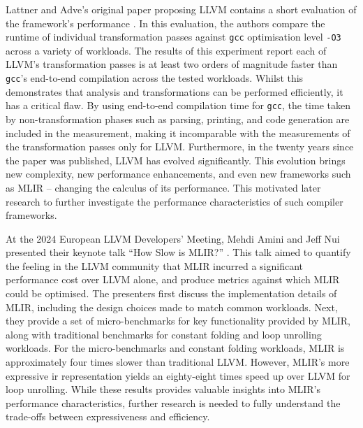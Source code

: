 Lattner and Adve's original paper proposing LLVM contains a short evaluation of the framework's performance \cite[Section 4.1.4]{lattnerLLVMCompilationFramework2004}.
In this evaluation, the authors compare the runtime of individual transformation passes against \texttt{gcc} optimisation level \texttt{-O3} across a variety of workloads.
The results of this experiment \cite[Table 2]{lattnerLLVMCompilationFramework2004} report each of LLVM's transformation passes is at least two orders of magnitude faster than \texttt{gcc}'s end-to-end compilation across the tested workloads. Whilst this demonstrates that analysis and transformations can be performed efficiently, it has a critical flaw. By using end-to-end compilation time for \texttt{gcc}, the time taken by non-transformation phases such as parsing, printing, and code generation are included in the measurement, making it incomparable with the measurements of the transformation passes only for LLVM.
Furthermore, in the twenty years since the paper was published, LLVM has evolved significantly. This evolution brings new complexity, new performance enhancements, and even new frameworks such as MLIR -- changing the calculus of its performance.
This motivated later research to further investigate the performance characteristics of such compiler frameworks.

At the 2024 European LLVM Developers' Meeting, Mehdi Amini and Jeff Nui presented their keynote talk ``How Slow is MLIR?'' \cite{aminiHowSlowMLIR2024}.
This talk aimed to quantify the feeling in the LLVM community that MLIR incurred a significant performance cost over LLVM alone, and produce metrics against which MLIR could be optimised.
The presenters first discuss the implementation details of MLIR, including the design choices made to match common workloads.
Next, they provide a set of micro-benchmarks for key functionality provided by MLIR, along with traditional benchmarks for constant folding and loop unrolling workloads. For the micro-benchmarks and constant folding workloads, MLIR is approximately four times slower than traditional LLVM. However, MLIR's more expressive \ac{ir} representation yields an eighty-eight times speed up over LLVM for loop unrolling.
While these results provides valuable insights into MLIR's performance characteristics, further research is needed to fully understand the trade-offs between expressiveness and efficiency.


